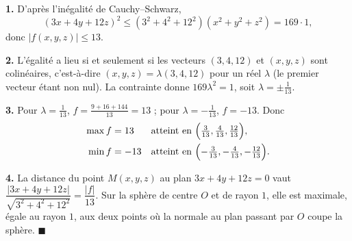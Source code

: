 \textbf{1.} D'après l'inégalité de Cauchy--Schwarz,
\[
(3x + 4y + 12z)^2 \leqslant (3^2 + 4^2 + 12^2)(x^2 + y^2 + z^2) = 169 \cdot 1 ,
\]
donc $|f(x, y, z)| \leqslant 13$.

\textbf{2.} L'égalité a lieu si et seulement si les vecteurs $(3, 4, 12)$ et
$(x, y, z)$ sont colinéaires, c'est-à-dire $(x, y, z) = \lambda(3, 4, 12)$
pour un réel $\lambda$ (le premier vecteur étant non nul). La contrainte
donne $169\lambda^2 = 1$, soit $\lambda = \pm\frac{1}{13}$.

\textbf{3.} Pour $\lambda = \frac1{13}$, $f = \frac{9 + 16 + 144}{13} = 13$ ;
pour $\lambda = -\frac1{13}$, $f = -13$. Donc
\[
\begin{aligned}
\max f &= 13 &&\text{atteint en } \Bigl(\tfrac{3}{13}, \tfrac{4}{13}, \tfrac{12}{13}\Bigr), \\
\min f &= -13 &&\text{atteint en } \Bigl(-\tfrac{3}{13}, -\tfrac{4}{13}, -\tfrac{12}{13}\Bigr).
\end{aligned}
\]

\textbf{4.} La distance du point $M(x, y, z)$ au plan $3x + 4y + 12z = 0$ vaut
$\dfrac{|3x + 4y + 12z|}{\sqrt{3^2 + 4^2 + 12^2}} = \dfrac{|f|}{13}$. Sur la
sphère de centre $O$ et de rayon $1$, elle est maximale, égale au rayon $1$,
aux deux points où la normale au plan passant par $O$ coupe la sphère.
\hfill $\blacksquare$
